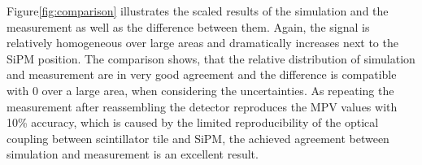 Figure\enspace\ref{fig:comparison} illustrates the scaled results of the simulation and the measurement as well as the difference between them. Again, the signal is relatively homogeneous over large areas and dramatically increases next to the SiPM position. The comparison shows, that the relative distribution of simulation and measurement are in very good agreement and the difference is compatible with 0 over a large area, when considering the uncertainties. As repeating the measurement after reassembling the detector reproduces the MPV values with 10\% accuracy, which is caused by the limited reproducibility of the optical coupling between scintillator tile and SiPM, the achieved agreement between simulation and measurement is an excellent result.

